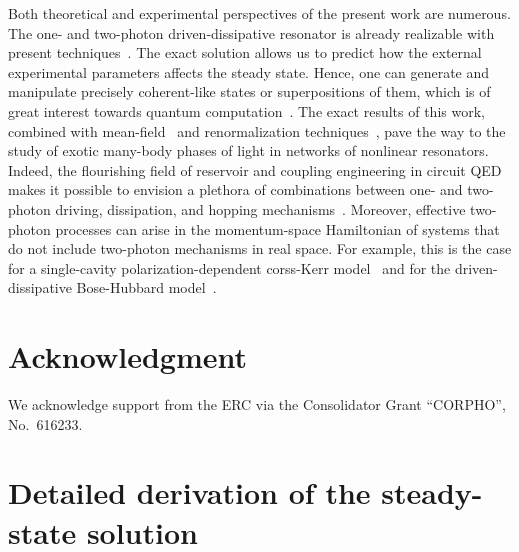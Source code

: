 Both theoretical and experimental perspectives of the present work are numerous.
The one- and two-photon driven-dissipative resonator is already realizable with present techniques~\cite{LeghtasScience15}.
The exact solution allows us to predict how the external experimental parameters affects the steady state. Hence, one can generate and manipulate precisely coherent-like states or superpositions of them, which is of great interest towards quantum computation~\cite{GilchristJOB04,OurjoumtsevScience06,MirrahimiNJP14,GotoPRA16,PuriarXiv16}.
The exact results of this work, combined with mean-field~\cite{LeBoitePRL13,LeBoitePRA14} and renormalization techniques~\cite{SchollwockRMP05,FinazziPRL15}, pave the way to the study of exotic many-body phases of light in networks of nonlinear resonators.
Indeed, the flourishing field of reservoir and coupling engineering in circuit QED makes it possible to envision a plethora of combinations between one- and two-photon driving, dissipation, and hopping mechanisms~\cite{JinPRL13,JinPRA14}.
Moreover, effective two-photon processes can arise in the momentum-space Hamiltonian of systems that do not include two-photon mechanisms in real space.
For example, this is the case for a single-cavity polarization-dependent corss-Kerr model~\cite{ParaisoNatMat10,TakemuraNatPhys14} and for the driven-dissipative Bose-Hubbard model~\cite{GeraceNatPhys09,CarusottoPRL09,CarusottoRMP13,WilsonarXiv16}.


\section*{Acknowledgment}
We acknowledge support from the ERC via the Consolidator Grant “CORPHO”, No.~616233.



\appendix
\section{Detailed derivation of the steady-state solution}\label{App:Solution}


